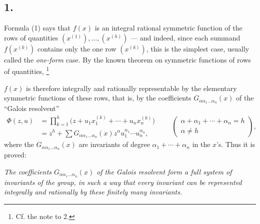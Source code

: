 \documentclass[11pt]{article}
\providecommand{\NoetherSrcNote}[2]{%
  \begingroup
  \renewcommand{\thefootnote}{#1}%
  \footnote{#2}%
  \addtocounter{footnote}{-1}%
  \endgroup}
\begin{document}
\subsection*{1.}
Formula (1) says that $f(x)$ is an integral rational symmetric function of the rows of quantities $(x^{(1)}),
\ldots,(x^{(h)})$ --- and indeed, since each summand $f(x^{(k)})$ contains only the one row $(x^{(k)})$, this is the simplest case, usually called the \emph{one-form} case. By the known theorem on symmetric functions of rows of quantities,\NoetherSrcNote{*)}{Cf. the note to 2.} $f(x)$ is therefore integrally and rationally representable by the elementary symmetric functions of these rows, that is, by the coefficients $G_{\alpha\alpha_1\ldots\alpha_n}(x)$ of the ``Galois resolvent''
\[
\begin{aligned}
  \Phi(z,u)
  &=\prod_{k=1}^{h}\bigl(z+u_1x_1^{(k)}+\cdots+u_nx_n^{(k)}\bigr) \\
  &=z^h+
    \sum G_{\alpha\alpha_1\ldots\alpha_n}(x)
    z^{\alpha}u_1^{\alpha_1}\cdots u_n^{\alpha_n},
\end{aligned}
\qquad
\left(\begin{array}{c}
\alpha+\alpha_1+
\cdots+
\alpha_n=h\\
\alpha\ne h
\end{array}\right),
\]
where the $G_{\alpha\alpha_1\ldots\alpha_n}(x)$ are invariants of degree $\alpha_1+\cdots+\alpha_n$ in the $x$'s. Thus it is proved:

\emph{The coefficients $G_{\alpha\alpha_1\ldots\alpha_n}(x)$ of the Galois resolvent form a full system of invariants of the group, in such a way that every invariant can be represented integrally and rationally by these finitely many invariants.}
\end{document}
